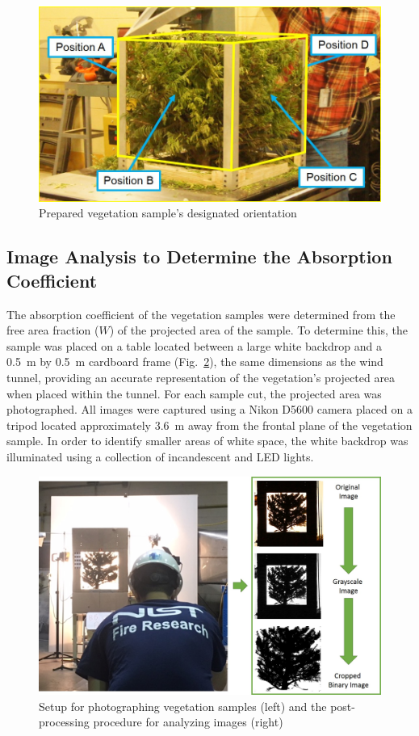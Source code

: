 \documentclass[12pt]{article}
\begin{document}
\begin{figure} [!]
	\centering 	\includegraphics[width=1.0\linewidth]{Picture3.jpg}
	\caption{Prepared vegetation sample's designated orientation}
	\label{fig:Vegpos}
\end{figure}

\subsection{Image Analysis to Determine the Absorption Coefficient }
\label{ssec:headingscap}

The absorption coefficient of the vegetation samples were determined from the free area fraction ($W$) of the projected area of the sample. To determine this, the sample was placed on a table located between a large white backdrop and a 0.5~m by 0.5~m cardboard frame (Fig.~\ref{fig:ImgAnaly}), the same dimensions as the wind tunnel, providing an accurate representation of the vegetation's projected area when placed within the tunnel. For each sample cut, the projected area was photographed. All images were captured using a Nikon D5600 camera placed on a tripod located approximately 3.6~\si{m} away from the frontal plane of the vegetation sample. In order to identify smaller areas of white space, the white backdrop was illuminated using a collection of incandescent and LED lights.

\begin{figure} [!h]
	\centering 	\includegraphics[width=1.0\linewidth]{Picture5.jpg}
	\caption{Setup for photographing vegetation samples (left) and the post-processing procedure for analyzing images (right)}
	\label{fig:ImgAnaly}
\end{figure}
\end{document}
